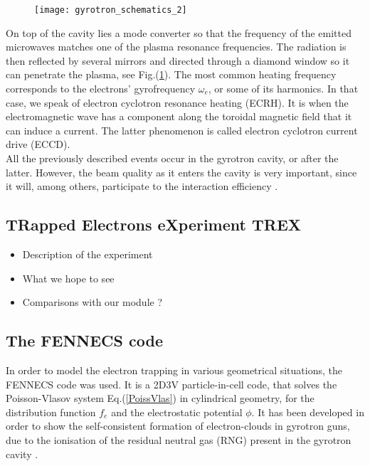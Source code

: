 \begin{figure}[h!]
\centering
	\texttt{[image: gyrotron\_schematics\_2]}
	\caption{\label{gyrotron} }
\end{figure}  

\noindent On top of the cavity lies a mode converter so that the frequency of the emitted microwaves matches one of the plasma resonance frequencies. The radiation is then reflected by several mirrors and directed through a diamond window so it can penetrate the plasma, see Fig.(\ref{gyrotron}). The most common heating frequency corresponds to the electrons' gyrofrequency $\omega_e$, or some of its harmonics. In that case, we speak of electron cyclotron resonance heating (ECRH). It is when the electromagnetic wave has a component along the toroidal magnetic field that it can induce a current. The latter phenomenon is called electron cyclotron current drive (ECCD).\\



All the previously described events occur in the gyrotron cavity, or after the latter. However, the beam quality as it enters the cavity is very important, since it will, among others, participate to the interaction efficiency \cite{Pagonakis}.

\subsection{TRapped Electrons eXperiment TREX}
\begin{itemize}
\item{Description of the experiment}
\item{What we hope to see}
\item{Comparisons with our module ?}
\end{itemize}


\subsection{The FENNECS code}
In order to model the electron trapping in various geometrical situations, the FENNECS code \cite{fennecs} was used. It is a 2D3V particle-in-cell code, that solves the Poisson-Vlasov system Eq.(\ref{PoissVlas}) in cylindrical geometry, for the distribution function $f_e$ and the electrostatic potential $\phi$. It has been developed in order to show the self-consistent formation of electron-clouds in gyrotron guns, due to the ionisation of the residual neutral gas (RNG) present in the gyrotron cavity \cite{lebars_et_al}.  

